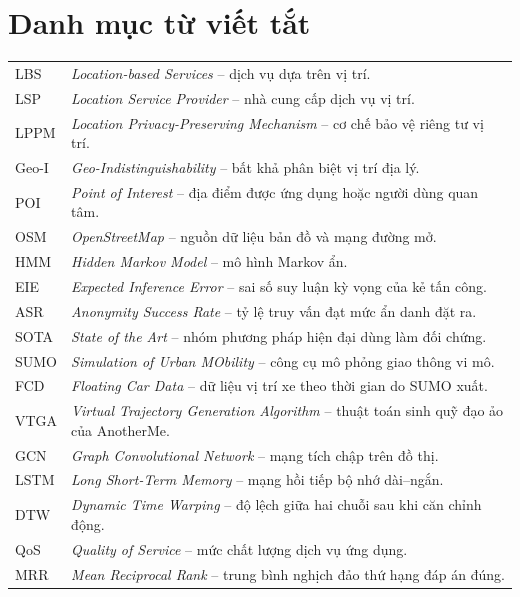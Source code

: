 \documentclass[12pt,a4paper,oneside]{report}
\newcommand{\term}[1]{\textit{#1}}
\begin{document}
\chapter*{Danh mục từ viết tắt}
\begin{tabular}{P{2.6cm}P{11.8cm}}
LBS & \term{Location-based Services} -- dịch vụ dựa trên vị trí.\\
LSP & \term{Location Service Provider} -- nhà cung cấp dịch vụ vị trí.\\
LPPM & \term{Location Privacy-Preserving Mechanism} -- cơ chế bảo vệ riêng tư vị trí.\\
Geo-I & \term{Geo-Indistinguishability} -- bất khả phân biệt vị trí địa lý.\\
POI & \term{Point of Interest} -- địa điểm được ứng dụng hoặc người dùng quan tâm.\\
OSM & \term{OpenStreetMap} -- nguồn dữ liệu bản đồ và mạng đường mở.\\
HMM & \term{Hidden Markov Model} -- mô hình Markov ẩn.\\
EIE & \term{Expected Inference Error} -- sai số suy luận kỳ vọng của kẻ tấn công.\\
ASR & \term{Anonymity Success Rate} -- tỷ lệ truy vấn đạt mức ẩn danh đặt ra.\\
SOTA & \term{State of the Art} -- nhóm phương pháp hiện đại dùng làm đối chứng.\\
SUMO & \term{Simulation of Urban MObility} -- công cụ mô phỏng giao thông vi mô.\\
FCD & \term{Floating Car Data} -- dữ liệu vị trí xe theo thời gian do SUMO xuất.\\
VTGA & \term{Virtual Trajectory Generation Algorithm} -- thuật toán sinh quỹ đạo ảo của AnotherMe.\\
GCN & \term{Graph Convolutional Network} -- mạng tích chập trên đồ thị.\\
LSTM & \term{Long Short-Term Memory} -- mạng hồi tiếp bộ nhớ dài--ngắn.\\
DTW & \term{Dynamic Time Warping} -- độ lệch giữa hai chuỗi sau khi căn chỉnh động.\\
QoS & \term{Quality of Service} -- mức chất lượng dịch vụ ứng dụng.\\
MRR & \term{Mean Reciprocal Rank} -- trung bình nghịch đảo thứ hạng đáp án đúng.\\
\end{tabular}

\cleardoublepage
{}
\end{document}
